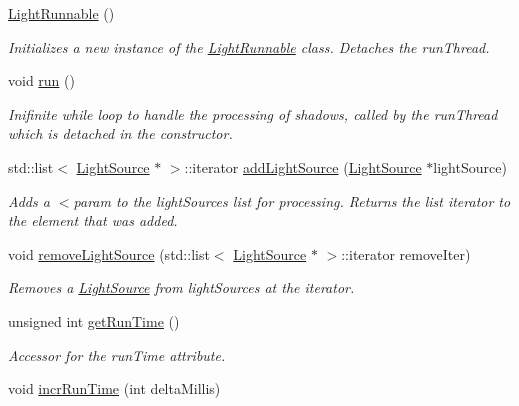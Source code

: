\begin{DoxyCompactItemize}
\item 
\hyperlink{classlighting_1_1LightRunnable_a176933fd3e89721baff6fcd0fcbe22b5}{Light\+Runnable} ()
\begin{DoxyCompactList}\small\item\em Initializes a new instance of the \hyperlink{classlighting_1_1LightRunnable}{Light\+Runnable} class. Detaches the run\+Thread. \end{DoxyCompactList}\item 
void \hyperlink{classlighting_1_1LightRunnable_abd7dfb6a9fc5efd3730326eb85d852d0}{run} ()
\begin{DoxyCompactList}\small\item\em Inifinite while loop to handle the processing of shadows, called by the run\+Thread which is detached in the constructor. \end{DoxyCompactList}\item 
std\+::list$<$ \hyperlink{classlighting_1_1LightSource}{Light\+Source} $\ast$ $>$\+::iterator \hyperlink{classlighting_1_1LightRunnable_ad2960655756b3d62b6e06d62201ce7ba}{add\+Light\+Source} (\hyperlink{classlighting_1_1LightSource}{Light\+Source} $\ast$light\+Source)
\begin{DoxyCompactList}\small\item\em Adds a $<$param to the light\+Sources list for processing. Returns the list iterator to the element that was added. \end{DoxyCompactList}\item 
void \hyperlink{classlighting_1_1LightRunnable_ae15fb41a32d0373000949fc35048d833}{remove\+Light\+Source} (std\+::list$<$ \hyperlink{classlighting_1_1LightSource}{Light\+Source} $\ast$ $>$\+::iterator remove\+Iter)
\begin{DoxyCompactList}\small\item\em Removes a \hyperlink{classlighting_1_1LightSource}{Light\+Source} from light\+Sources at the iterator. \end{DoxyCompactList}\item 
unsigned int \hyperlink{classlighting_1_1LightRunnable_ad6246dbabc4efc33a2fe7ea3b0ae75aa}{get\+Run\+Time} ()
\begin{DoxyCompactList}\small\item\em Accessor for the run\+Time attribute. \end{DoxyCompactList}\item 
void \hyperlink{classlighting_1_1LightRunnable_ad6e6889bc97931c64d6c75097a2e5215}{incr\+Run\+Time} (int delta\+Millis)

\end{DoxyCompactItemize}
